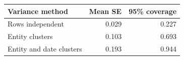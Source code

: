 \begin{tabular}{@{}lrr@{}}
\toprule
Variance method & Mean SE & 95\% coverage\\
\midrule
Rows independent & 0.029 & 0.227\\
Entity clusters & 0.103 & 0.693\\
Entity and date clusters & 0.193 & 0.944\\
\bottomrule
\end{tabular}

